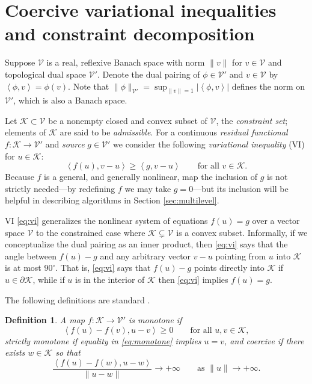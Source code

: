 \documentclass[letterpaper,final,12pt,reqno]{amsart}
\theoremstyle{cstyle}
\theoremstyle{dstyle}
\newtheorem{definition}[theorem]{Definition}
\numberwithin{equation}{section}
\numberwithin{figure}{section}
\numberwithin{table}{section}
\numberwithin{theorem}{section}
\newcommand{\cK}{\mathcal{K}}
\newcommand{\cV}{\mathcal{V}}
\newcommand{\ip}[2]{\left<#1,#2\right>}
\begin{document}
\section{Coercive variational inequalities and constraint decomposition} \label{sec:vi}

Suppose $\cV$ is a real, reflexive Banach space with norm $\|v\|$ for $v\in\cV$ and topological dual space $\cV'$.  Denote the dual pairing of $\phi \in \cV'$ and $v\in\cV$ by $\ip{\phi}{v} = \phi(v)$.  Note that $\|\phi\|_{\cV'} = \sup_{\|v\|=1} |\ip{\phi}{v}|$ defines the norm on $\cV'$, which is also a Banach space.

Let $\cK \subset \cV$ be a nonempty closed and convex subset of $\cV$, the \emph{constraint set}; elements of $\cK$ are said to be \emph{admissible}.  For a continuous \emph{residual functional} $f:\cK \to \cV'$ and \emph{source} $g\in \cV'$ we consider the following \emph{variational inequality} (VI) for $u\in \cK$:
\begin{equation}
\ip{f(u)}{v-u} \ge \ip{g}{v-u} \qquad \text{for all } v\in \cK. \label{eq:vi}
\end{equation}
Because $f$ is a general, and generally nonlinear, map the inclusion of $g$ is not strictly needed---by redefining $f$ we may take $g=0$---but its inclusion will be helpful in describing algorithms in Section \ref{sec:multilevel}.

VI \eqref{eq:vi} generalizes the nonlinear system of equations $f(u)=g$ over a vector space $\cV$ to the constrained case where $\cK \subsetneq \cV$ is a convex subset.  Informally, if we conceptualize the dual pairing as an inner product, then \eqref{eq:vi} says that the angle between $f(u)-g$ and any arbitrary vector $v-u$ pointing from $u$ into $\cK$ is at most $90^\circ$.  That is, \eqref{eq:vi} says that $f(u)-g$ points directly into $\cK$ if $u\in\partial\cK$, while if $u$ is in the interior of $\cK$ then \eqref{eq:vi} implies $f(u)=g$.

The following definitions are standard \cite{KinderlehrerStampacchia1980}.

\begin{definition} A map $f:\cK \to \cV'$ is \emph{monotone} if
\begin{equation}
\ip{f(u)-f(v)}{u-v} \ge 0 \qquad \text{for all } u,v \in \cK, \label{eq:monotone}
\end{equation}
\emph{strictly monotone} if equality in \eqref{eq:monotone} implies $u=v$, and \emph{coercive} if there exists $w \in \cK$ so that
\begin{equation}
\frac{\ip{f(u)-f(w)}{u-w}}{\|u-w\|} \to +\infty \qquad \text{as } \|u\|\to +\infty. \label{eq:coercive}
\end{equation}
\end{definition}
\end{document}
